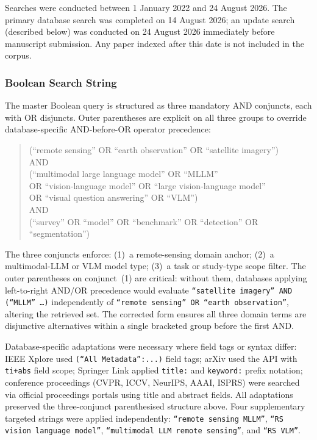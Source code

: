 Searches were conducted between 1 January 2022 and 24 August 2026.
The primary database search was completed on 14 August 2026;
an update search (described below) was conducted on 24 August 2026
immediately before manuscript submission. Any paper indexed after this date is not
included in the corpus.

\subsubsection{Boolean Search String}\label{sec2:boolean}

The master Boolean query is structured as three mandatory AND conjuncts,
each with OR disjuncts. Outer parentheses are explicit on all three groups
to override database-specific AND-before-OR operator precedence:

\smallskip
\begin{quote}\ttfamily\small
(``remote sensing'' OR ``earth observation'' OR ``satellite imagery'')\\
AND\\
(``multimodal large language model'' OR ``MLLM''\\
\phantom{(}OR ``vision-language model'' OR ``large vision-language model''\\
\phantom{(}OR ``visual question answering'' OR ``VLM'')\\
AND\\
(``survey'' OR ``model'' OR ``benchmark'' OR ``detection'' OR ``segmentation'')
\end{quote}
\smallskip

\noindent The three conjuncts enforce: (1)~a remote-sensing domain anchor;
(2)~a multimodal-LLM or VLM model type; (3)~a task or study-type scope filter.
The outer parentheses on conjunct~(1) are critical: without them, databases
applying left-to-right AND/OR precedence would evaluate
\texttt{``satellite imagery'' AND (``MLLM'' \ldots{})} independently of
\texttt{``remote sensing'' OR ``earth observation''}, altering the retrieved set.
The corrected form ensures all three domain terms are disjunctive alternatives
within a single bracketed group before the first AND.

Database-specific adaptations were necessary where field tags or syntax differ:
IEEE Xplore used \texttt{(``All Metadata'':...)} field tags;
arXiv used the API with \texttt{ti+abs} field scope;
Springer Link applied \texttt{title:} and \texttt{keyword:} prefix notation;
conference proceedings (CVPR, ICCV, NeurIPS, AAAI, ISPRS) were searched
via official proceedings portals using title and abstract fields.
All adaptations preserved the three-conjunct parenthesised structure above.
Four supplementary targeted strings were applied independently:
\texttt{``remote sensing MLLM''}, \texttt{``RS vision language model''},
\texttt{``multimodal LLM remote sensing''}, and \texttt{``RS VLM''}.


